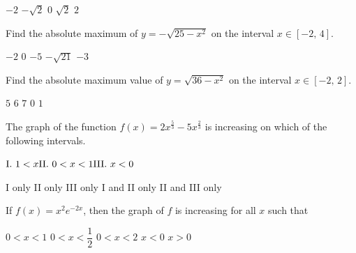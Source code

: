 \begin{questions}
    \begin{oneparchoices}
        \choice $-2$
        \choice $-\sqrt{2}$
        \choice $0$
        \choice $\sqrt{2}$
        \choice $2$
    \end{oneparchoices} \par \horizontalline

    \question Find the absolute maximum of $y = -\sqrt{25 - x^2}$ on the interval $x \in [-2, \, 4]$. \\

    \begin{oneparchoices}
        \choice $-2$
        \choice $0$
        \choice $-5$
        \choice $-\sqrt{21}$
        \choice $-3$
    \end{oneparchoices} \par \horizontalline

    \question Find the absolute maximum value of $y = \sqrt{36 - x^2}$ on the interval $x \in [-2, \, 2]$. \\

    \begin{oneparchoices}
        \choice $5$
        \choice $6$
        \choice $7$
        \choice $0$
        \choice $1$
    \end{oneparchoices} \par \horizontalline

    \question The graph of the function $f(x) = 2x^{\frac{5}{3}} - 5x^{\frac{2}{3}}$ is increasing on which of the following intervals. \begin{center}
        $\hfill \text{I. $1 < x$} \hfill \text{II. $0 < x < 1$} \hfill \text{III. $x < 0$} \hfill$
    \end{center} \vspace{11pt}

    \begin{oneparchoices}
        \choice I only 
        \choice II only
        \choice III only 
        \choice I and II only
        \choice II and III only
    \end{oneparchoices} \par \horizontalline

    \question If $f(x) = x^2e^{-2x}$, then the graph of $f$ is increasing for all $x$ such that \\

    \begin{oneparchoices}
        \choice $0 < x < 1$
        \choice $0 < x < \dfrac{1}{2}$
        \choice $0 < x < 2$
        \choice $x < 0$
        \choice $x > 0$
    \end{oneparchoices} \par \horizontalline


\end{questions}
